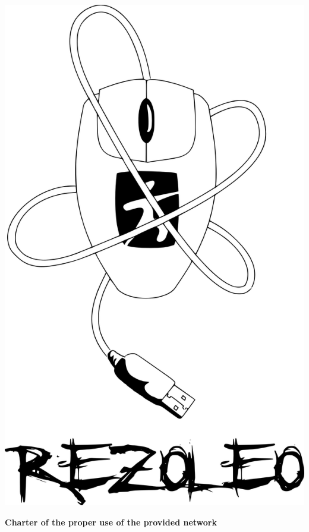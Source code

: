 \documentclass[12pt]{article}
\begin{document}
	
\thispagestyle{empty}

\begin{minipage}{0.2\linewidth}
	\includegraphics[scale=0.15]{rezoleo.png}
\end{minipage}\hfill
\begin{minipage}{0.80\linewidth}
{\huge \textbf{Charter of the proper use of the provided network}}
\end{minipage}

\vspace*{0.3cm}

\end{document}
